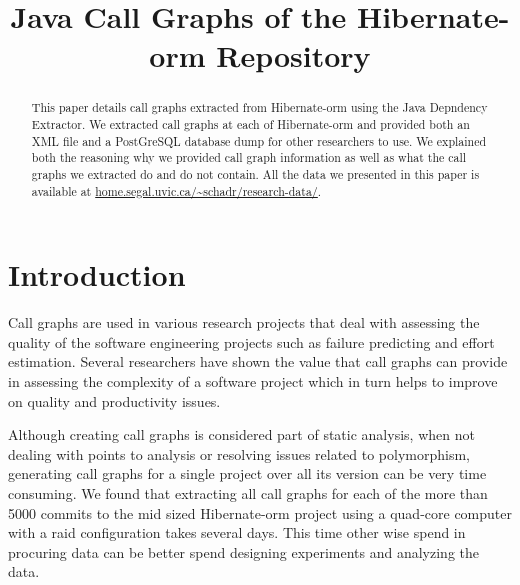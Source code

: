 \documentclass[conference]{IEEEtran}
\begin{document}
\title{Java Call Graphs of the Hibernate-orm Repository}


\author{
\and
{}
\and
{}
\and
{}
\and
{}
}

\maketitle


\begin{abstract}
This paper details call graphs extracted from Hibernate-orm using the Java Depndency Extractor.
We extracted call graphs at each of Hibernate-orm and provided both an XML file and a PostGreSQL database dump for other researchers to use.
We explained both the reasoning why we provided call graph information as well as what the call graphs we extracted do and do not contain.
All the data we presented in this paper is available at \url{home.segal.uvic.ca/~schadr/research-data/}.
\end{abstract}

\IEEEpeerreviewmaketitle

\section{Introduction}
Call graphs are used in various research projects that deal with assessing the quality of the software engineering projects such as failure predicting and effort estimation.
Several researchers have shown the value that call graphs can provide in assessing the complexity of a software project which in turn helps to improve on quality and productivity issues.

Although creating call graphs is considered part of static analysis, when not dealing with points to analysis or resolving issues related to polymorphism, generating call graphs for a single project over all its version can be very time consuming.
We found that extracting all call graphs for each of the more than 5000 commits to the mid sized Hibernate-orm project using a quad-core computer with a raid configuration takes several days.
This time other wise spend in procuring data can be better spend designing experiments and analyzing the data.
\end{document}
